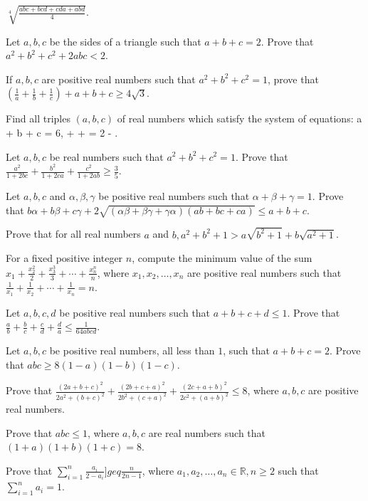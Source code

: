   $\sqrt[4]{\frac{abc + bcd + cda + abd}{4}}$.
\item Let $a, b, c$ be the sides of a triangle such that $a + b + c = 2$. Prove that $a^2 + b^2 + c^2 + 2abc < 2$.
\item If $a, b, c$ are positive real numbers such that $a^2 + b^2 + c^2 = 1$, prove that $\left(\frac{1}{a} + \frac{1}{b} +
  \frac{1}{c}\right) + a + b + c\geq 4\sqrt{3}$.
\item Find all triples $(a, b, c)$ of real numbers which satisfy the system of equations:
  \startformula a + b + c = 6,\stopformula
  \startformula {} +  +  = 2 - .\stopformula
\item Let $a, b, c$ be real numbers such that $a^2 + b^2 + c^2 = 1$. Prove that $\frac{a^2}{1 + 2bc} + \frac{b^2}{1 + 2ca} +
  \frac{c^2}{1 + 2ab}\geq \frac{3}{5}$.
\item Let $a, b, c$ and $\alpha, \beta, \gamma$ be positive real numbers such that $\alpha + \beta + \gamma = 1$. Prove that
  $b\alpha + b\beta + c\gamma + 2\sqrt{(\alpha\beta + \beta\gamma + \gamma\alpha)(ab + bc + ca)}\leq a + b + c$.
\item Prove that for all real numbers $a$ and $b, a^2 + b^2 + 1 > a\sqrt{b^2 + 1} + b\sqrt{a^2 + 1}$.
\item For a fixed positive integer $n$, compute the minimum value of the sum $x_1 + \frac{x_2^2}{2} + \frac{x_3^3}{3} + \cdots +
  \frac{x_n^n}{n}$, where $x_1, x_2, \ldots, x_n$ are positive real numbers such that $\frac{1}{x_1} + \frac{1}{x_2} + \cdots +
  \frac{1}{x_n} = n$.
\item Let $a, b, c, d$ be positive real numbers such that $a + b + c + d\leq 1$. Prove that $\frac{a}{b} +  \frac{b}{c} +
  \frac{c}{d} + \frac{d}{a}\leq \frac{1}{64abcd}$.
\item Let $a, b, c$ be positive real numbers, all less than $1$, such that $a + b + c = 2$. Prove that $abc\geq 8(1 - a)(1 - b)(1 -
  c)$.
\item Prove that $\frac{(2a + b + c)^2}{2a^2 + (b + c)^2} + \frac{(2b + c + a)^2}{2b^2 + (c + a)^2} + \frac{(2c + a + b)^2}{2c^2 +
  (a + b)^2}\leq 8$, where $a, b, c$ are positive real numbers.
\item Prove that $abc\leq 1$, where $a, b, c$ are real numbers such that $(1 + a)(1 + b)(1 + c) = 8$.
\item Prove that $\displaystyle\sum_{i=1}^n\frac{a_i}{2 - a_i}]geq \frac{n}{2n - 1}$, where $a_1, a_2, \ldots, a_n \in\mathbb{R},
  n\geq 2$ such that $\displaystyle\sum_{i=1}^na_i = 1$.

